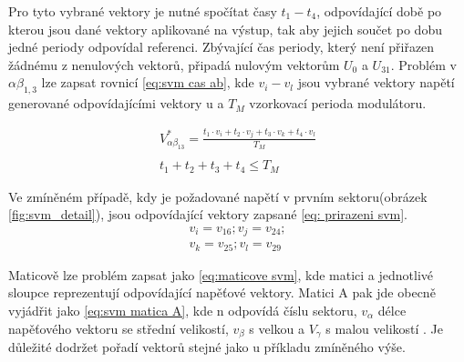 Pro tyto vybrané vektory je nutné spočítat časy $t_1 -t_4$, odpovídající době po kterou jsou dané vektory aplikované na výstup, tak aby jejich součet po dobu jedné periody odpovídal referenci. Zbývající čas periody, který není přiřazen žádnému z nenulových vektorů, připadá nulovým vektorům $U_0$ a $U_{31}$.
Problém v $\alpha \beta_{1,3}$ lze zapsat rovnicí \ref{eq:svm cas ab}, kde $v_i - v_l$ jsou vybrané vektory napětí generované odpovídajícími vektory u  a $T_M$  vzorkovací perioda modulátoru.


\begin{equation}
    \label{eq:svm cas ab}
    \begin{gathered}
    V_{\alpha\beta_{13}}^* = \frac{t_1 \cdot v_i +t_2\cdot v_j + t_3\cdot v_k + t_4\cdot v_l}{T_M} \\ \\
    t_1+t_2+t_3+t_4 \leq T_M
    \end{gathered}
\end{equation}

Ve zmíněném případě, kdy je požadované napětí v prvním sektoru(obrázek \ref{fig:svm_detail}), jsou odpovídající vektory zapsané \ref{eq: prirazeni svm}.
\begin{equation}
\label{eq: prirazeni svm}
   \begin{gathered}
    v_i=v_{16};   
    v_j=v_{24};\\
    v_k=v_{25};
    v_l=v_{29}
   \end{gathered} 
\end{equation}

Maticově lze problém zapsat jako \ref{eq:maticove svm}, kde matici a jednotlivé sloupce reprezentují odpovídající napěťové  vektory. Matici A pak jde obecně vyjádřit jako \ref{eq:svm matica A}, kde n odpovídá číslu sektoru, $v_\alpha$ délce  napěťového vektoru se střední velikostí, $v_\beta$ s velkou a $V_\gamma$  s malou  velikostí . Je důležité dodržet pořadí vektorů stejné jako u příkladu zmíněného výše.\cite{analyseOfMultiphase}


